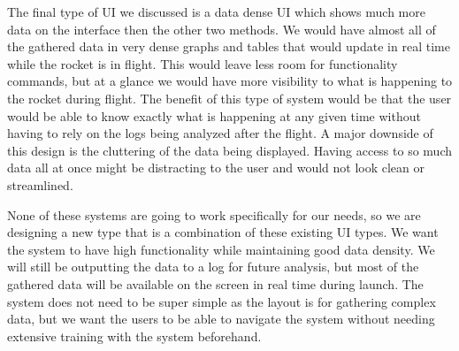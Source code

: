 \documentclass[10pt,draftclsnofoot,onecolumn]{IEEEtran}
\begin{document}
	The final type of UI we discussed is a data dense UI which shows much more data on the interface then the other two methods. We would have almost all of the gathered data in very dense graphs and tables that would update in real time while the rocket is in flight. This would leave less room for functionality commands, but at a glance we would have more visibility to what is happening to the rocket during flight. The benefit of this type of system would be that the user would be able to know exactly what is happening at any given time without having to rely on the logs being analyzed after the flight. A major downside of this design is the cluttering of the data being displayed. Having access to so much data all at once might be distracting to the user and would not look clean or streamlined. \par

	None of these systems are going to work specifically for our needs, so we are designing a new type that is a combination of these existing UI types. We want the system to have high functionality while maintaining good data density. We will still be outputting the data to a log for future analysis, but most of the gathered data will be available on the screen in real time during launch. The system does not need to be super simple as the layout is for gathering complex data, but we want the users to be able to navigate the system without needing extensive training with the system beforehand. \par
	
\end{document}
